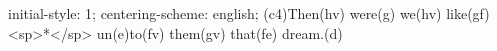 initial-style: 1;
centering-scheme: english;
(c4)Then(hv) were(g) we(hv) like(gf) <sp>*</sp> un(e)to(fv) them(gv) that(fe) dream.(d)
